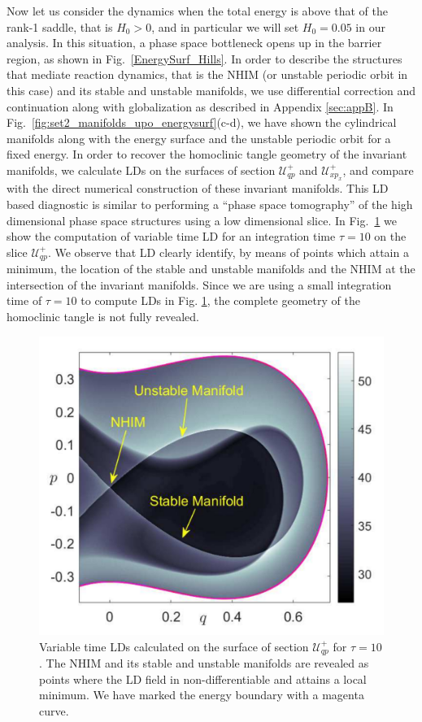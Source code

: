 \documentclass{ws-ijbc}
\begin{document}
Now let us consider the dynamics when the total energy is above that of the rank-1 saddle, that is $H_0 > 0$, and in particular we will set $H_0 = 0.05$ in our analysis. In this situation, a phase space bottleneck opens up in the barrier region, as shown in Fig.~\ref{EnergySurf_Hills}. In order to describe the structures that mediate reaction dynamics, that is the NHIM (or unstable periodic orbit in this case) and its stable and unstable manifolds, we use differential correction and continuation along with globalization as described in Appendix \ref{sec:appB}. In Fig.~\ref{fig:set2_manifolds_upo_energysurf}(c-d), we have shown the cylindrical manifolds along with the energy surface and the unstable periodic orbit for a fixed energy. In order to recover the homoclinic tangle geometry of the invariant manifolds, we calculate LDs on the surfaces of section $\mathcal{U}^{+}_{qp}$ and $\mathcal{U}^{+}_{xp_x}$, and compare with the direct numerical construction of these invariant manifolds. This LD based diagnostic is similar to performing a ``phase space tomography'' of the high dimensional phase space structures using a low dimensional slice. In Fig.~\ref{LD_NHIM_detect} we show the computation of variable time LD for an integration time $\tau = 10$ on the slice $\mathcal{U}^{+}_{qp}$. We observe that LD clearly identify, by means of points which attain a minimum, the location of the stable and unstable manifolds and the NHIM at the intersection of the invariant manifolds. Since we are using a small integration time of $\tau = 10$ to compute LDs in Fig. \ref{LD_NHIM_detect}, the complete geometry of the homoclinic tangle is not fully revealed. 
\begin{figure}[!ht]
	\begin{center}		
		\includegraphics[scale=0.45]{fig11}
	\end{center}
	\caption{Variable time LDs calculated on the surface of section $\mathcal{U}^{+}_{qp}$ for $\tau = 10$. The NHIM and its stable and unstable manifolds are revealed as points where the LD field in non-differentiable and attains a local minimum. We have marked the energy boundary with a magenta curve.}
	\label{LD_NHIM_detect}
\end{figure}
\end{document}
